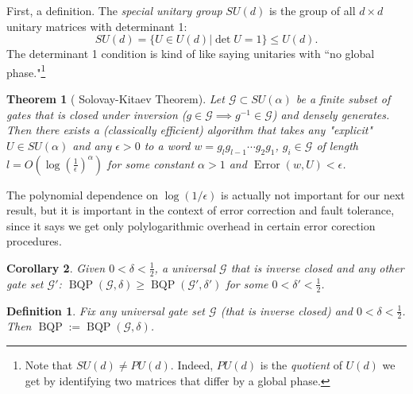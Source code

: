 \documentclass{article}
\newtheorem{thm}{Theorem}
\newtheorem*{dfn}{Definition}
\newtheorem{cor}[thm]{Corollary}
\newcommand{\calG}{\mathcal{G}}
\begin{document}
First, a definition.  The \emph{special unitary group} $SU(d)$ is the group of all $d \times d$ unitary matrices with determinant 1:
\[SU(d) = \{U \in U(d) | \det U = 1\} \le U(d).\]
The determinant 1 condition is kind of like saying unitaries with ``no global phase."\footnote{Note that $SU(d) \neq PU(d)$. Indeed, $PU(d)$ is the \emph{quotient} of $U(d)$ we get by identifying two matrices that differ by a global phase.} 

\begin{thm}[
	Solovay-Kitaev Theorem]

Let \(\calG \subset SU(\alpha)\) be a finite subset of gates that is closed under inversion (\(g \in \calG \implies g^{-1} \in \calG\)) and densely generates. Then there exists a (classically efficient) algorithm that takes any "explicit" \(U \in SU(\alpha)\) and any \(\epsilon > 0\) to a word \(w = g_l g_{l-1} \dotsb g_2 g_1\), \(g_i \in \calG\) of length \(l = O(\log\left(\frac{1}{\epsilon}\right)^\alpha)\) for some constant \(\alpha > 1\) and \(\operatorname{Error}(w, U) < \epsilon\).

\end{thm}

The polynomial dependence on $\log(1/\epsilon)$ is actually not important for our next result, but it is important in the context of error correction and fault tolerance, since it says we get only polylogarithmic overhead in certain error corection procedures.

\begin{cor}
    Given \(0 < \delta < \frac{1}{2}\), a universal \(\calG\) that is inverse closed and any other gate set \(\calG'\): \(\operatorname{BQP}(\calG, \delta) \geq \operatorname{BQP}(\calG', \delta')\) for some \(0 < \delta' < \frac{1}{2}\).
\end{cor}

\begin{dfn}
	Fix any universal gate set \(\calG\) (that is inverse closed) and \(0 < \delta < \frac{1}{2}\). Then \(\operatorname{BQP} := \operatorname{BQP}(\calG, \delta)\).
\end{dfn}
\end{document}
